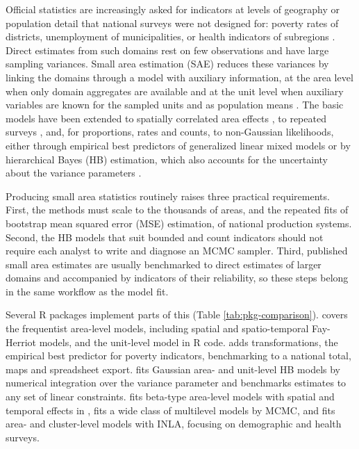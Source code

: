 Official statistics are increasingly asked for indicators at levels of geography or population detail that national surveys were not designed for: poverty rates of districts, unemployment of municipalities, or health indicators of subregions \citep{rao2015small, pfeffermann2013new}. Direct estimates from such domains rest on few observations and have large sampling variances. Small area estimation (SAE) reduces these variances by linking the domains through a model with auxiliary information, at the area level when only domain aggregates are available \citep{fay1979estimates} and at the unit level when auxiliary variables are known for the sampled units and as population means \citep{battese1988error}. The basic models have been extended to spatially correlated area effects \citep{petrucci2006small, pratesi2008small}, to repeated surveys \citep{marhuenda2013small}, and, for proportions, rates and counts, to non-Gaussian likelihoods, either through empirical best predictors of generalized linear mixed models \citep{boubeta2016empirical} or by hierarchical Bayes (HB) estimation, which also accounts for the uncertainty about the variance parameters \citep{rao2015small, janicki2020properties, fabrizi2011hierarchical}.

Producing small area statistics routinely raises three practical requirements. First, the methods must scale to the thousands of areas, and the repeated fits of bootstrap mean squared error (MSE) estimation, of national production systems. Second, the HB models that suit bounded and count indicators should not require each analyst to write and diagnose an MCMC sampler. Third, published small area estimates are usually benchmarked to direct estimates of larger domains and accompanied by indicators of their reliability, so these steps belong in the same workflow as the model fit.

Several R packages implement parts of this (Table \ref{tab:pkg-comparison}).  \citep{molina2015sae} covers the frequentist area-level models, including spatial and spatio-temporal Fay-Herriot models, and the unit-level model in R code.  \citep{kreutzmann2019emdi} adds transformations, the empirical best predictor for poverty indicators, benchmarking to a national total, maps and spreadsheet export.  \citep{boonstra2022hbsae} fits Gaussian area- and unit-level HB models by numerical integration over the variance parameter and benchmarks estimates to any set of linear constraints.  \citep{denicolo2024tipsae} fits beta-type area-level models with spatial and temporal effects in ,  \citep{boonstra2022mcmcsae} fits a wide class of multilevel models by MCMC, and  \citep{li2019changes, li2025summer} fits area- and cluster-level models with INLA, focusing on demographic and health surveys.

